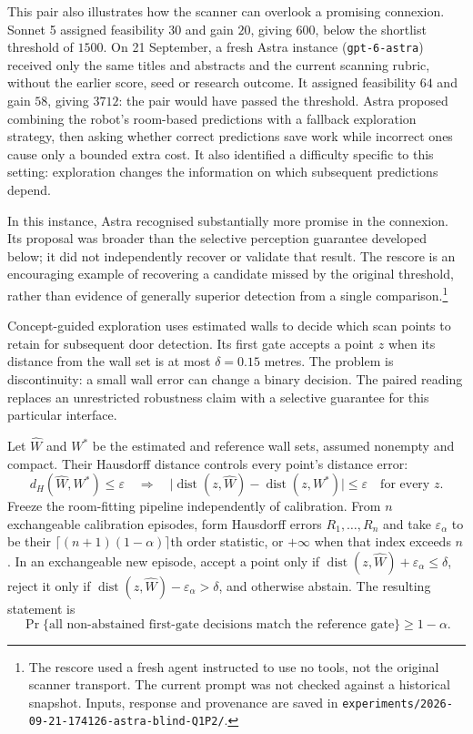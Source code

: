 \documentclass[11pt,a4paper]{article}
\newcommand{\file}[1]{\texttt{#1}}
\begin{document}
This pair also illustrates how the scanner can overlook a promising connexion.
Sonnet 5 assigned feasibility $30$ and gain $20$, giving $600$, below the
shortlist threshold of $1500$. On 21 September, a fresh Astra instance
(\file{gpt-6-astra}) received only the same titles and abstracts and the current
scanning rubric, without the earlier score, seed or research outcome. It
assigned feasibility $64$ and gain $58$, giving $3712$: the pair would have
passed the threshold. Astra proposed combining the robot's room-based
predictions with a fallback exploration strategy, then asking whether correct
predictions save work while incorrect ones cause only a bounded extra cost.
It also identified a difficulty specific to this setting: exploration changes
the information on which subsequent predictions depend.

In this instance, Astra recognised substantially more promise in the connexion.
Its proposal was broader than the selective perception guarantee developed
below; it did not independently recover or validate that result. The rescore
is an encouraging example of recovering a candidate missed by the original
threshold, rather than evidence of generally superior detection from a single
comparison.\footnote{The rescore used a fresh agent instructed to use no tools,
not the original scanner transport. The current prompt was not checked against
a historical snapshot. Inputs, response and provenance are saved in
\file{experiments/2026-09-21-174126-astra-blind-Q1P2/}.}

Concept-guided exploration uses estimated walls to decide which scan points to
retain for subsequent door detection. Its first gate accepts a point $z$ when
its distance from the wall set is at most $\delta=0.15$ metres. The problem is
discontinuity: a small wall error can change a binary decision. The paired
reading replaces an unrestricted robustness claim with a selective guarantee for
this particular interface.

Let $\widehat W$ and $W^*$ be the estimated and reference wall sets, assumed
nonempty and compact. Their Hausdorff distance controls every point's distance
error:
\begin{equation}
 d_H(\widehat W,W^*)\leq\varepsilon
 \quad\Longrightarrow\quad
 \bigl|\operatorname{dist}(z,\widehat W)
       -\operatorname{dist}(z,W^*)\bigr|\leq\varepsilon
 \quad\text{for every }z.
 \label{eq:pilot-wall}
\end{equation}
Freeze the room-fitting pipeline independently of calibration. From $n$
exchangeable calibration episodes, form Hausdorff errors $R_1,\ldots,R_n$ and
take $\varepsilon_\alpha$ to be their $\lceil(n+1)(1-\alpha)\rceil$th order
statistic, or $+\infty$ when that index exceeds $n$. In an exchangeable new
episode, accept a point only if $\operatorname{dist}(z,\widehat
W)+\varepsilon_\alpha\leq\delta$, reject it only if
$\operatorname{dist}(z,\widehat W)-\varepsilon_\alpha>\delta$, and otherwise
abstain. The resulting statement is
\begin{equation}
 \Pr\{\text{all non-abstained first-gate decisions match the reference gate}\}
 \geq 1-\alpha.
 \label{eq:pilot-selective}
\end{equation}
\end{document}
